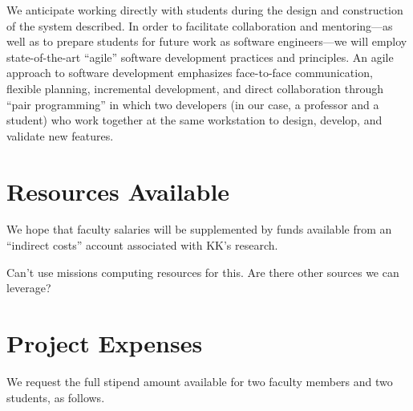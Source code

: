 \documentclass{article}
\begin{document}

We anticipate working directly with students
during the design and construction of the system described.
In order to facilitate collaboration and mentoring---as well as
to prepare students for future work
as software engineers---we will employ state-of-the-art
``agile'' software development
practices and principles.
An agile approach to software development emphasizes
face-to-face communication,
flexible planning,
incremental development,
and direct collaboration through ``pair programming'' in which two developers
(in our case, a professor and a student)
who work together at the same workstation
to design, develop, and validate new features.

\section{Resources Available}
\label{sec:resources-available}



We hope that faculty salaries will be supplemented
by funds available from
an ``indirect costs'' account associated with KK's research.

\begin{framed}
  Can't use missions computing resources for this.
  Are there other sources we can leverage?
\end{framed}

\section{Project Expenses}
\label{sec:project-expenses}



We request the full stipend amount available for
two faculty members
and two students, as follows.
\end{document}
